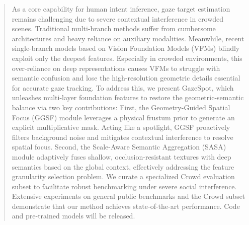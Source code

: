 \documentclass[sigconf,review,anonymous,screen]{acmart}
\begin{document}
\begin{abstract}
As a core capability for human intent inference, gaze target estimation remains challenging due to severe contextual interference in crowded scenes. Traditional multi-branch methods suffer from cumbersome architectures and heavy reliance on auxiliary modalities. Meanwhile, recent single-branch models based on Vision Foundation Models (VFMs) blindly exploit only the deepest features. Especially in crowded environments, this over-reliance on deep representations causes VFMs to struggle with semantic confusion and lose the high-resolution geometric details essential for accurate gaze tracking. To address this, we present GazeSpot, which unleashes multi-layer foundation features to restore the geometric-semantic balance via two key contributions: First, the Geometry-Guided Spatial Focus (GGSF) module leverages a physical frustum prior to generate an explicit multiplicative mask. Acting like a spotlight, GGSF proactively filters background noise and mitigates contextual interference to resolve spatial focus. Second, the Scale-Aware Semantic Aggregation (SASA) module adaptively fuses shallow, occlusion-resistant textures with deep semantics based on the global context, effectively addressing the feature granularity selection problem. We curate a specialized Crowd evaluation subset to facilitate robust benchmarking under severe social interference. Extensive experiments on general public benchmarks and the Crowd subset demonstrate that our method achieves state-of-the-art performance.
Code and pre-trained models will be released.
\end{abstract}
\end{document}
